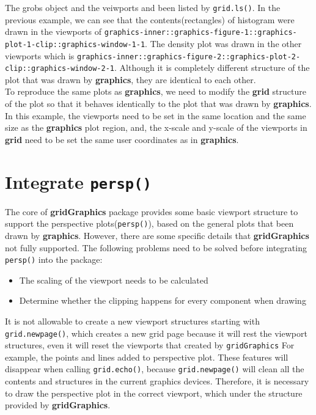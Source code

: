\documentclass{report}
\begin{document}
The grobs object and the veiwports and been listed by \texttt{grid.ls()}. In the previous example, we can see that the contents(rectangles) of histogram were drawn in the viewports of \texttt{graphics-inner::graphics-figure-1::graphics-plot-1-clip::graphics-window-1-1}. The density plot was drawn in the other viewports which is \texttt{graphics-inner::graphics-figure-2::graphics-plot-2-clip::graphics-window-2-1}. Although it is completely different structure of the plot that was drawn by \textbf{graphics}, they are identical to each other.\\

To reproduce the same plots as \textbf{graphics}, we need to modify the \textbf{grid} structure of the plot so that it behaves identically to the plot that was drawn by \textbf{graphics}. In this example, the viewports need to be set in the same location and the same size as the \textbf{graphics} plot region, and, the x-scale and y-scale of the viewports in \textbf{grid} need to be set the same user coordinates as in \textbf{graphics}.\\

\section{Integrate \texttt{persp()}}
The core of \textbf{gridGraphics} package provides some basic viewport structure to support the perspective plots(\texttt{persp()}), based on the general plots that been drawn by \textbf{graphics}. However, there are some specific details that \textbf{gridGraphics} not fully supported.
The following problems need to be solved before integrating \texttt{persp()} into the package:
\begin{itemize}
	\item{The scaling of the viewport needs to be calculated}
	\item{Determine whether the clipping happens for every component when drawing}
\end{itemize}

It is not allowable to create a new viewport structures starting with \texttt{grid.newpage()}, which creates a new grid page because it will rest the viewport structures, even it will reset the viewports that created by \texttt{gridGraphics}
For example, the points and lines added to perspective plot. These features will disappear when calling \texttt{grid.echo()}, because \texttt{grid.newpage()} will clean all the contents and structures in the current graphics devices. Therefore, it is necessary to draw the perspective plot in the correct viewport, which under the structure provided by \textbf{gridGraphics}.\\
\end{document}
